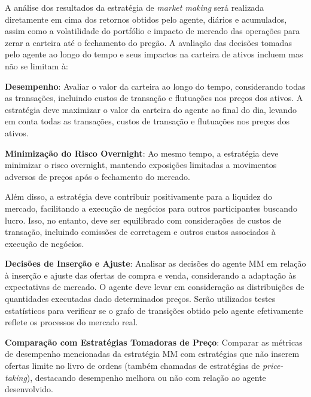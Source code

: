 A análise dos resultados da estratégia de \textit{market making} será  realizada diretamente em cima dos retornos obtidos pelo agente, diários e acumulados, assim como a volatilidade do portfólio e impacto de mercado das operações para zerar a carteira até o fechamento do pregão. A avaliação das decisões tomadas pelo agente ao longo do tempo e seus impactos na carteira de ativos incluem mas não se limitam à:

\textbf{Desempenho}: Avaliar o valor da carteira ao longo do tempo, considerando todas as transações, incluindo custos de transação e flutuações nos preços dos ativos.
A estratégia deve maximizar o valor da carteira do agente ao final do dia, levando em conta todas as transações, custos de transação e flutuações nos preços dos ativos.

\textbf{Minimização do Risco Overnight}: Ao mesmo tempo, a estratégia deve minimizar o risco overnight, mantendo exposições limitadas a movimentos adversos de preços após o fechamento do mercado.

Além disso, a estratégia deve contribuir positivamente para a liquidez do mercado, facilitando a execução de negócios para outros participantes buscando lucro. Isso, no entanto, deve ser equilibrado com considerações de custos de transação, incluindo comissões de corretagem e outros custos associados à execução de negócios.

\textbf{Decisões de Inserção e Ajuste}: Analisar as decisões do agente MM em relação à inserção e ajuste das ofertas de compra e venda, considerando a adaptação às expectativas de mercado. O agente deve levar em consideração as distribuições de quantidades executadas dado determinados preços. Serão utilizados testes estatísticos para verificar se o grafo de transições obtido pelo agente efetivamente reflete os processos do mercado real.


\textbf{Comparação com Estratégias Tomadoras de Preço}: Comparar as métricas de desempenho mencionadas da estratégia MM com estratégias que não inserem ofertas limite no livro de ordens (também chamadas de estratégias de \textit{price-taking}), destacando desempenho melhora ou não com relação ao agente desenvolvido.

